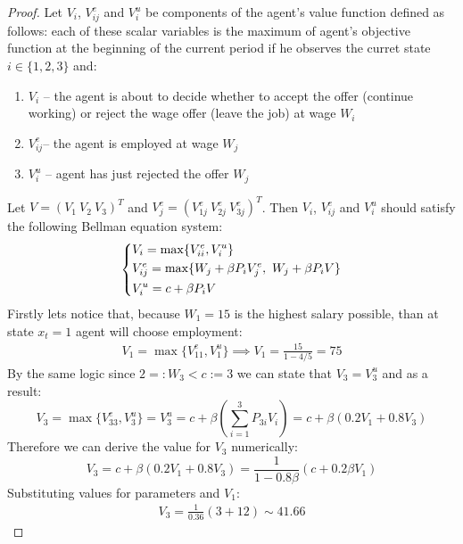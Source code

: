 \documentclass[12pt,reqno]{amsart}
\theoremstyle{plain}
\newcommand{\Ve}{V^{e}}
\newcommand{\Vu}{V^{u}}
\begin{document}
\begin{proof}
    Let $ V_{i} $, $ V_{ij}^{e} $ and $ \Vu_{i} $ be components of the agent’s value function
    defined as follows: each of these scalar variables is the maximum of agent’s objective function
    at the beginning of the current period if he observes the curret state $ i\in\{1, 2, 3\} $ and:
    \begin{enumerate}
        \item $ V_i $ -- the agent is about to decide whether to accept the offer (continue working)
              or reject the wage offer (leave the job) at wage $ W_{i} $
        \item  $ \Ve_{ij} $-- the agent is employed at wage $ W_{j} $
        \item $ \Vu_{i} $ -- agent has just rejected the offer $ W_j $
    \end{enumerate}
    Let $ V = \left( V_1 ~ V_{2}~V_{3} \right)^{T} $ and
    $\Ve_{j} = \left( \Ve_{1j}~\Ve_{2j}~\Ve_{3j} \right)^{T}$. Then $ V_{i} $, $ \Ve_{ij} $ and
    $ \Vu_{i} $ should satisfy the following Bellman equation system:
    \[
        \begin{dcases}
            V_i = \max \{\Ve_{ii}, \Vu_{i}\}                                           \\
            \Ve_{ij} = \max \{ W_{j} + \beta P_{i}V^{e}_{j}, ~W_{j} + \beta P_{i}V  \} \\
            \Vu_i = c + \beta P_{i}V
        \end{dcases}
    \]
    Firstly lets notice that, because $ W_{1} = 15 $ is the highest salary possible, than at state
    $x_{t} = 1$ agent will choose employment:
    \begin{gather}
        V_1 = \max \{ V_{11}^{e}, V_{1}^{u} \} \implies V_{1} = \frac{15}{1 - 4/5} = 75
    \end{gather}
    By the same logic since $ 2 =: W_{3} < c := 3 $ we can state that $ V_3 = V_{3}^{u} $ and as a
    result:
    \[
        V_3 = \max \{V_{33}^{e}, V_{3}^{u} \} = V_{3}^{u} = c + \beta \left( \sum_{i=1}^{3}P_{3i}V_i \right)
        = c + \beta \left( 0.2V_{1} + 0.8 V_{3} \right)
    \]
    Therefore we can derive the value for $ V_{3} $ numerically:
    \[
        V_3 = c + \beta \left( 0.2V_{1} + 0.8 V_{3} \right) =  \frac{1}{1 - 0.8\beta} \left( c + 0.2\beta V_1  \right)
    \]
    Substituting values for parameters and $ V_{1} $:
    \begin{gather}
        V_3 = \frac{1}{0.36}\left( 3 + 12  \right) \sim 41.66
    \end{gather}

\end{proof}
\end{document}
